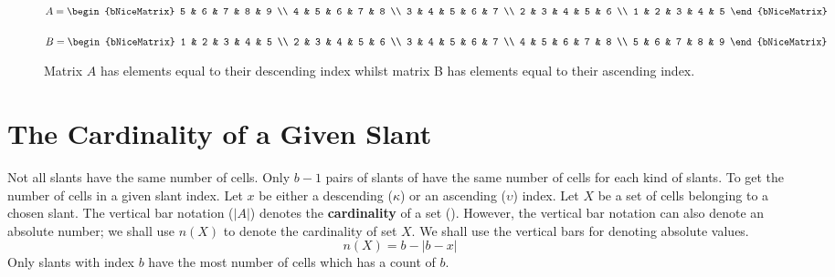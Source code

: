 \documentclass[letterpaper, twoside,12pt]{book}
\begin{document}
    \begin{figure}[h]
        \centering
        \begin{minipage}{0.45\textwidth}
            \centering
            {$
            A =
            \begin{bNiceMatrix}
                5 & 6 & 7 & 8 & 9 \\
                4 & 5 & 6 & 7 & 8 \\
                3 & 4 & 5 & 6 & 7 \\
                2 & 3 & 4 & 5 & 6 \\
                1 & 2 & 3 & 4 & 5
            \end{bNiceMatrix}
            $}
        \end{minipage}
        \hfill
        \begin{minipage}{0.45\textwidth}
            \centering
            {$
            B =
            \begin{bNiceMatrix}
                1 & 2 & 3 & 4 & 5 \\
                2 & 3 & 4 & 5 & 6 \\
                3 & 4 & 5 & 6 & 7 \\
                4 & 5 & 6 & 7 & 8 \\
                5 & 6 & 7 & 8 & 9
            \end{bNiceMatrix}
            $}
        \end{minipage}
        \caption{Matrix $A$ has elements equal to their descending index whilst matrix B has elements equal to their ascending index.}
    \end{figure}

    \section{The Cardinality of a Given Slant} \label{slant_cardinality}
    Not all slants have the same number of cells. Only $b-1$ pairs of slants of have the same number of cells for each kind of slants. To get the number of cells in a given slant index. Let $x$ be either a descending ($\kappa$) or an ascending ($\upsilon$) index. Let $X$ be a set of cells belonging to a chosen slant. The vertical bar notation ($|A|$) denotes the \textbf{cardinality} of a set (\cite{math_vault}). However, the vertical bar notation can also denote an absolute number; we shall use $n(X)$ to denote the cardinality of set $X$. We shall use the vertical bars for denoting absolute values.
    \begin{equation}
        n(X) = b - |b - x|
    \end{equation}
    Only slants with index $b$ have the most number of cells which has a count of $b$.
\end{document}

